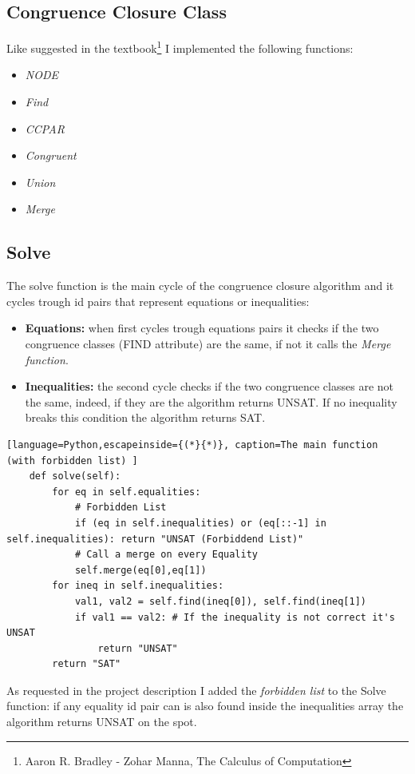 \documentclass[a4paper]{article}
\begin{document}
\subsection{Congruence Closure Class}

\noindent
Like suggested in the textbook\footnote{Aaron R. Bradley - Zohar Manna, The Calculus of Computation} I implemented the following functions:
\begin{itemize}
    \item \textit{NODE}
    \item \textit{Find}
    \item \textit{CCPAR}
    \item \textit{Congruent}
    \item \textit{Union} 
    \item \textit{Merge}
\end{itemize}
\subsection{Solve}
The solve function is the main cycle of the congruence closure algorithm and it cycles trough id pairs that represent equations or inequalities:
\begin{itemize}
    \item \textbf{Equations:} when first cycles trough equations pairs it checks if the two congruence classes (FIND attribute) are the same, if not it calls the \textit{Merge function}.
    \item \textbf{Inequalities:} the second cycle checks if the two congruence classes are not the same, indeed, if they are the algorithm returns UNSAT. If no inequality breaks this condition the algorithm returns SAT.
\end{itemize}
\begin{lstlisting}[language=Python,escapeinside={(*}{*)}, caption=The main function (with forbidden list) ]
    def solve(self):
        for eq in self.equalities:
            # Forbidden List  
            if (eq in self.inequalities) or (eq[::-1] in self.inequalities): return "UNSAT (Forbiddend List)"
            # Call a merge on every Equality 
            self.merge(eq[0],eq[1])
        for ineq in self.inequalities:
            val1, val2 = self.find(ineq[0]), self.find(ineq[1])
            if val1 == val2: # If the inequality is not correct it's UNSAT 
                return "UNSAT"
        return "SAT"
\end{lstlisting}
\newpage
\noindent
As requested in the project description I added the \textit{forbidden list} to the Solve function: 
if any equality id pair can is also found inside the inequalities array the algorithm returns UNSAT on the spot.
\end{document}
